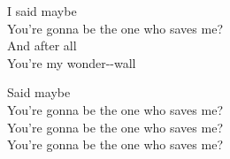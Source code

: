 \begin{enumerate}
 I said  maybe   \\ 
 You’re gonna be the one who  saves me?   \\ 
And  after  all  \\ 
 You’re my  wonder--wall   

 Said  maybe   \\ 
 You’re gonna be the one who  saves me?   \\ 
 You’re gonna be the one who  saves me?   \\ 
 You’re gonna be the one who  saves me?  

\end{enumerate}
